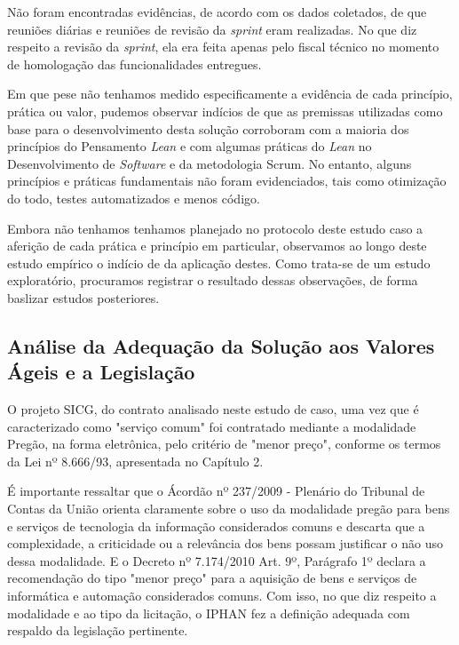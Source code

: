 Não foram encontradas evidências, de acordo com os dados coletados, de que reuniões diárias e reuniões de revisão da \textit{sprint} eram realizadas. No que diz respeito a revisão da \textit{sprint}, ela era feita apenas pelo fiscal técnico no momento de homologação das funcionalidades entregues.

Em que pese não tenhamos medido especificamente a evidência de cada princípio, prática ou valor, pudemos observar indícios de que as premissas utilizadas como base para o desenvolvimento desta solução corroboram com a maioria dos princípios do Pensamento \textit{Lean} e com algumas práticas do \textit{Lean} no Desenvolvimento de \textit{Software} e da metodologia Scrum. No entanto, alguns princípios e práticas fundamentais não foram evidenciados, tais como otimização do todo, testes automatizados e menos código. 

Embora não tenhamos tenhamos planejado no protocolo deste estudo caso a aferição de cada prática e princípio em particular, observamos ao longo deste estudo empírico o indício de da aplicação destes. Como trata-se de um estudo exploratório, procuramos registrar o resultado dessas observações, de forma baslizar estudos posteriores.


\subsection[Análise da Adequação da Solução aos Valores Ágeis e a Legislação]{Análise da Adequação da Solução aos Valores Ágeis e a Legislação}

O projeto SICG, do contrato analisado neste estudo de caso, uma vez que é caracterizado como "serviço comum" foi contratado mediante a modalidade Pregão, na forma eletrônica, pelo critério de "menor preço", conforme os termos da Lei nº 8.666/93, apresentada no Capítulo 2.

É importante ressaltar que o Ácordão nº 237/2009 - Plenário do Tribunal de Contas da União orienta claramente sobre o uso da modalidade pregão para bens e serviços de tecnologia da informação considerados comuns e descarta que a complexidade, a criticidade ou a relevância dos bens possam justificar o não uso dessa modalidade.  E o Decreto nº 7.174/2010 Art. 9º, Parágrafo 1º declara a recomendação do tipo "menor preço" para a aquisição de bens e serviços de informática e automação considerados comuns. Com isso, no que diz respeito a modalidade e ao tipo da licitação, o IPHAN fez a definição adequada com respaldo da legislação pertinente. 

